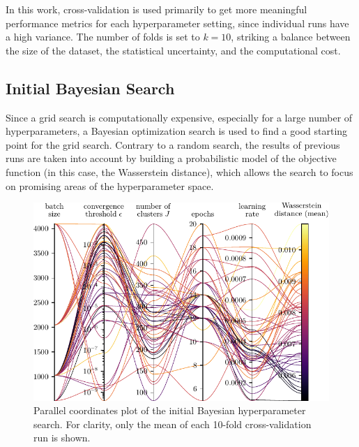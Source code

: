 In this work,
cross-validation is used primarily to get more meaningful performance metrics
for each hyperparameter setting,
  since individual runs have a high variance.
The number of folds is set to $k = 10$,
  striking a balance between
    the size of the dataset,
    the statistical uncertainty,
    and the computational cost.


\subsection{Initial Bayesian Search} \label{sec:hyperparameters:initial_bayesian}
Since a grid search is computationally expensive,
  especially for a large number of hyperparameters,
a Bayesian optimization search \cite{wandb_bayesian} is used to find a good starting point for the grid search.
Contrary to a random search,
the results of previous runs are taken into account
  by building a probabilistic model of the objective function
    (in this case, the Wasserstein distance),
  which allows the search to focus on promising areas of the hyperparameter space.

\begin{figure}
  \centering
  \includegraphics[scale=1]{content/plots/hyperparam/combined_pcplot_full.pdf}
  \caption{
    Parallel coordinates plot of the initial Bayesian hyperparameter search.
    For clarity, only the mean of each 10-fold cross-validation run is shown.
  }
  \label{fig:hyperparameter:bayesian}
\end{figure}

